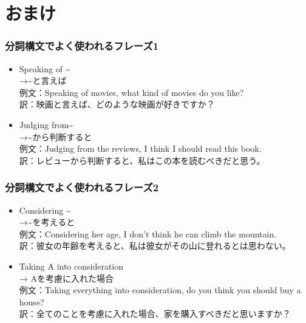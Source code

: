 \documentclass[xcolor=dvipsnames,unicode,14pt]{beamer}%
\begin{document}
\section{おまけ}
\begin{frame}
  \frametitle{分詞構文でよく使われるフレーズ1}

  \begin{itemize}
    \item Speaking of \textasciitilde \\ 
          →\textasciitilde と言えば \\
          例文：\textcolor{NavyBlue}{Speaking of movies}, what kind of movies do you like? \\ 
          訳：\textcolor{NavyBlue}{映画と言えば}、どのような映画が好きですか？
    \item Judging from\textasciitilde \\ 
        →\textasciitilde から判断すると \\
        例文：\textcolor{NavyBlue}{Judging from the reviews}, I think I should read this book. \\ 
        訳：\textcolor{NavyBlue}{レビューから判断すると}、私はこの本を読むべきだと思う。
  \end{itemize}

\end{frame}
\begin{frame}
  \frametitle{分詞構文でよく使われるフレーズ2}

  \begin{itemize}
    \item Considering \textasciitilde \\ 
          →\textasciitilde を考えると \\
          例文：\textcolor{NavyBlue}{Considering her age}, I don't think he can climb the mountain. \\ 
          訳：\textcolor{NavyBlue}{彼女の年齢を考えると}、私は彼女がその山に登れるとは思わない。
    \item Taking A into consideration \\ 
        → Aを考慮に入れた場合 \\
        例文：\textcolor{NavyBlue}{Taking everything into consideration}, do you think you should buy a house? \\ 
        訳：\textcolor{NavyBlue}{全てのことを考慮に入れた場合}、家を購入すべきだと思いますか？
  \end{itemize}

\end{frame}
\end{document}
